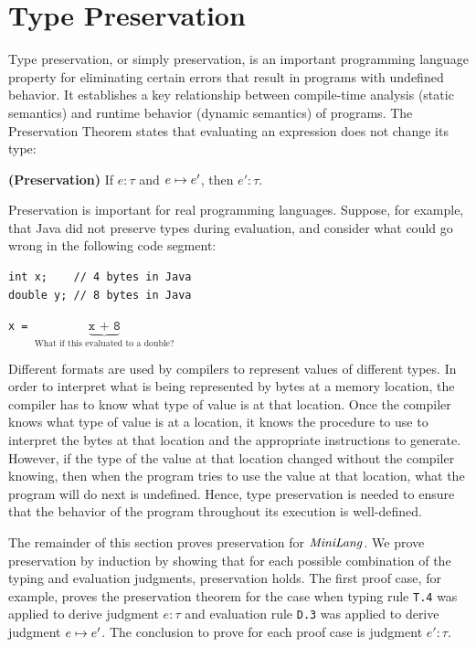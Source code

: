 \section{Type Preservation}
\label{sec:preservation}
Type preservation, or simply preservation, is an important
programming language property for eliminating certain errors
that result in programs with undefined behavior.
It establishes a key relationship between compile-time
analysis (static semantics) and runtime behavior
(dynamic semantics) of programs.
The Preservation Theorem states that evaluating an
expression does not change its type:

\begin{thm}
\label{thm:preservation}
\textbf{(Preservation)}
If $e : \tau$ and $e \mapsto e'$, then $e' : \tau$.
\end{thm}

Preservation is important for real programming languages.
Suppose, for example, that Java did not preserve types
during evaluation, and consider what could go wrong in
the following code segment:

\begin{verbatim}
int x;    // 4 bytes in Java
double y; // 8 bytes in Java
\end{verbatim}
\texttt{x = }$\underbrace{\texttt{x + 8}}_{\text{What if
this evaluated to a double?}}$

\linespace
Different formats are used by compilers to represent values of
different types.
In order to interpret what is being represented by bytes at
a memory location, the compiler has to know
what type of value is at that location.
Once the compiler knows what type of value is at a location,
it knows the procedure to use to interpret the bytes at that location
and the appropriate instructions to generate.
However, if the type of the value at that location changed without
the compiler knowing, then when the program tries to use the value
at that location, what the program will do next is undefined.
Hence, type preservation is needed to ensure that the behavior
of the program throughout its execution is well-defined.

The remainder of this section proves preservation for $\mathit{MiniLang}$.
We prove preservation by induction by showing that for each possible 
combination of the typing and evaluation judgments, preservation holds.
The first proof case, for example, proves the preservation theorem for
the case when typing rule \texttt{T.4} was applied to derive
judgment $e : \tau$ and evaluation rule \texttt{D.3} was applied
to derive judgment $e \mapsto e'$.
The conclusion to prove for each proof case is judgment $e' : \tau$.



